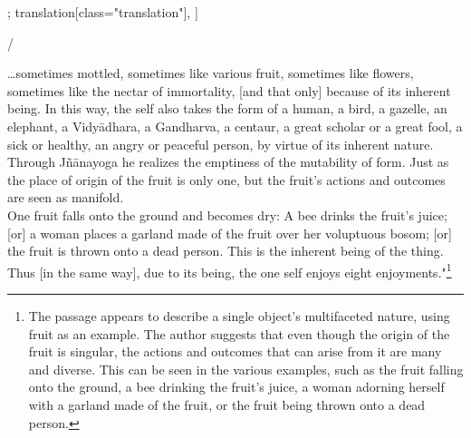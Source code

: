 \begin{alignment}[
  texts=edition[class="edition"];
  translation[class="translation"],
  ]
\begin{edition}
\begin{tlg}
{{  
  }
/}\\
\end{tlg}
  \end{edition}
  \begin{translation}
    \begin{tlate}
      \ldots sometimes mottled, sometimes like various fruit, sometimes like flowers, sometimes like the nectar of immortality, [and that only] because of its inherent being.\textsuperscript{\coro{[\lowroman{10}]}} In this way, the self also takes the form of a human, a bird, a gazelle, an elephant, a Vidyādhara, a Gandharva, a centaur, a great scholar or a great fool, a sick or healthy, an angry or peaceful person, by virtue of its inherent nature. Through Jñānayoga he realizes the emptiness of the mutability of form. Just as the place of origin of the fruit is only one, but the fruit's actions and outcomes are seen as manifold.\\

      One fruit falls onto the ground and becomes dry:\textsuperscript{\coro{[\lowroman{15}]}} A bee drinks the fruit's juice; [or] a woman places a garland made of the fruit over her voluptuous bosom; [or] the fruit is thrown onto a dead person. This is the inherent being of the thing. Thus [in the same way], due to its being, the one self enjoys eight enjoyments."\textsuperscript{\coro{[\lowroman{20}]}}\footnote{The passage appears to describe a single object's multifaceted nature, using fruit as an example. The author suggests that even though the origin of the fruit is singular, the actions and outcomes that can arise from it are many and diverse. This can be seen in the various examples, such as the fruit falling onto the ground, a bee drinking the fruit's juice, a woman adorning herself with a garland made of the fruit, or the fruit being thrown onto a dead person.

}
\end{tlate}
\end{translation}
\end{alignment}
